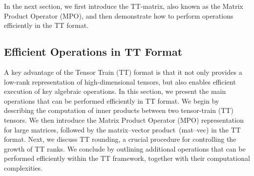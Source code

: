 In the next section, we first introduce the TT-matrix, also known as the Matrix Product Operator (MPO), and then demonstrate how to perform operations efficiently in the TT format.
\subsection{Efficient Operations in TT Format}\label{sec:efficient-operations}
A key advantage of the Tensor Train (TT) format is that it not only provides a low-rank representation of high-dimensional tensors, but also enables efficient execution of key algebraic operations.
In this section, we present the main operations that can be performed efficiently in TT format. We begin by describing the computation of inner products between two tensor-train (TT) tensors. We then introduce the Matrix Product Operator (MPO) representation for large matrices, followed by the matrix–vector product~(mat–vec) in the TT format. Next, we discuss TT rounding, a crucial procedure for controlling the growth of TT ranks. We conclude by outlining additional operations that can be performed efficiently within the TT framework, together with their computational complexities.
